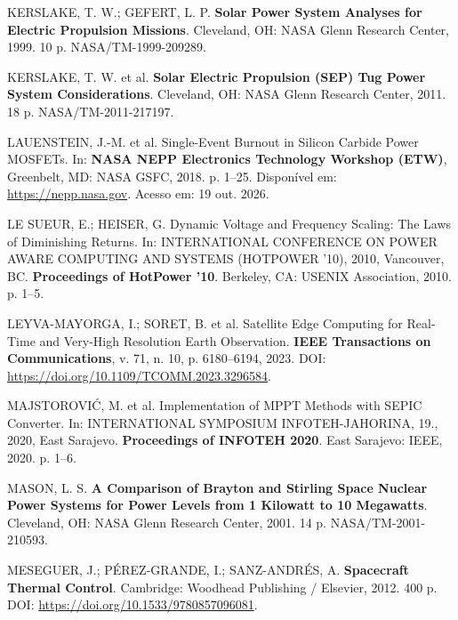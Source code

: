 \vspace{0.2cm}
\noindent KERSLAKE, T. W.; GEFERT, L. P. \textbf{Solar Power System Analyses for Electric Propulsion Missions}. Cleveland, OH: NASA Glenn Research Center, 1999. 10 p. NASA/TM-1999-209289.

\vspace{0.2cm}
\noindent KERSLAKE, T. W. et al. \textbf{Solar Electric Propulsion (SEP) Tug Power System Considerations}. Cleveland, OH: NASA Glenn Research Center, 2011. 18 p. NASA/TM-2011-217197.

\vspace{0.2cm}
\noindent LAUENSTEIN, J.-M. et al. Single-Event Burnout in Silicon Carbide Power MOSFETs. In: \textbf{NASA NEPP Electronics Technology Workshop (ETW)}, Greenbelt, MD: NASA GSFC, 2018. p. 1--25. Disponível em: \url{https://nepp.nasa.gov}. Acesso em: 19 out. 2026.

\vspace{0.2cm}
\noindent LE SUEUR, E.; HEISER, G. Dynamic Voltage and Frequency Scaling: The Laws of Diminishing Returns. In: INTERNATIONAL CONFERENCE ON POWER AWARE COMPUTING AND SYSTEMS (HOTPOWER '10), 2010, Vancouver, BC. \textbf{Proceedings of HotPower '10}. Berkeley, CA: USENIX Association, 2010. p. 1--5.

\vspace{0.2cm}
\noindent LEYVA-MAYORGA, I.; SORET, B. et al. Satellite Edge Computing for Real-Time and Very-High Resolution Earth Observation. \textbf{IEEE Transactions on Communications}, v. 71, n. 10, p. 6180--6194, 2023. DOI: \url{https://doi.org/10.1109/TCOMM.2023.3296584}.

\vspace{0.2cm}
\noindent MAJSTOROVIĆ, M. et al. Implementation of MPPT Methods with SEPIC Converter. In: INTERNATIONAL SYMPOSIUM INFOTEH-JAHORINA, 19., 2020, East Sarajevo. \textbf{Proceedings of INFOTEH 2020}. East Sarajevo: IEEE, 2020. p. 1--6.

\vspace{0.2cm}
\noindent MASON, L. S. \textbf{A Comparison of Brayton and Stirling Space Nuclear Power Systems for Power Levels from 1 Kilowatt to 10 Megawatts}. Cleveland, OH: NASA Glenn Research Center, 2001. 14 p. NASA/TM-2001-210593.

\vspace{0.2cm}
\noindent MESEGUER, J.; PÉREZ-GRANDE, I.; SANZ-ANDRÉS, A. \textbf{Spacecraft Thermal Control}. Cambridge: Woodhead Publishing / Elsevier, 2012. 400 p. DOI: \url{https://doi.org/10.1533/9780857096081}.

